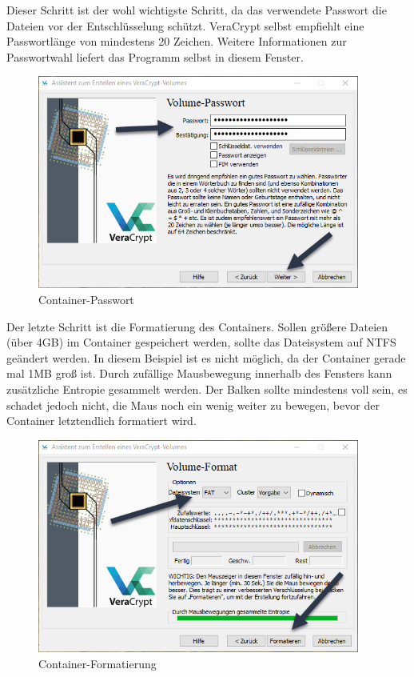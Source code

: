 \documentclass[12pt,a4paper]{scrreprt}
\begin{document}
\newpage

\noindent Dieser Schritt ist der wohl wichtigste Schritt, da das verwendete Passwort die Dateien vor der Entschlüsselung schützt. VeraCrypt selbst empfiehlt eine Passwortlänge von mindestens 20 Zeichen. Weitere Informationen zur Passwortwahl liefert das Programm selbst in diesem Fenster.

\begin{figure}[h]
\begin{center}
\includegraphics[width=300pt]{media/volumepassword.png}
\caption{Container-Passwort}
\label{containerpass}
\end{center}
\end{figure}

\noindent Der letzte Schritt ist die Formatierung des Containers. Sollen größere Dateien (über 4GB) im Container gespeichert werden, sollte das Dateisystem auf NTFS geändert werden. In diesem Beispiel ist es nicht möglich, da der Container gerade mal 1MB groß ist. Durch zufällige Mausbewegung innerhalb des Fensters kann zusätzliche Entropie gesammelt werden. Der Balken sollte mindestens voll sein, es schadet jedoch nicht, die Maus noch ein wenig weiter zu bewegen, bevor der Container letztendlich formatiert wird.

\begin{figure}[h]
\begin{center}
\includegraphics[width=300pt]{media/volumeformat.png}
\caption{Container-Formatierung}
\label{containerformat}
\end{center}
\end{figure}
\end{document}
